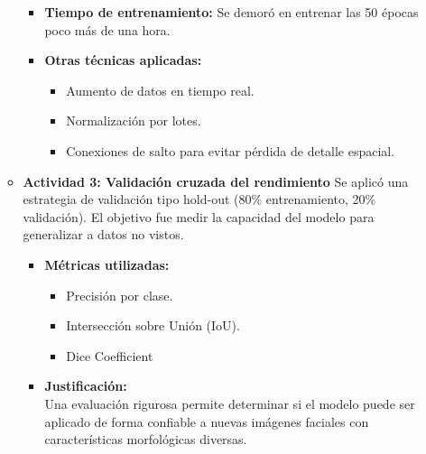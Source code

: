 \begin{enumerate}
\begin{itemize}
\begin{itemize}
  \item \textbf{Tiempo de entrenamiento:}
  Se demoró en entrenar las 50 épocas poco más de una hora.

  \item \textbf{Otras técnicas aplicadas:}
  \begin{itemize}
    \item Aumento de datos en tiempo real.
    \item Normalización por lotes.
    \item Conexiones de salto para evitar pérdida de detalle espacial.
  \end{itemize}
\end{itemize}

\vspace{0.5cm}


  \item\textbf{Actividad 3: Validación cruzada del rendimiento}
  Se aplicó una estrategia de validación tipo hold-out (80\% entrenamiento, 20\% validación). El objetivo fue medir la capacidad del modelo para generalizar a datos no vistos.

\begin{itemize}
  \item \textbf{Métricas utilizadas:}
  \begin{itemize}
    \item Precisión por clase.
    \item Intersección sobre Unión (IoU).
    \item Dice Coefficient
  \end{itemize}

  \item \textbf{Justificación:} \\
  Una evaluación rigurosa permite determinar si el modelo puede ser aplicado de forma confiable a nuevas imágenes faciales con características morfológicas diversas.
\end{itemize}



  \end{itemize}


\end{enumerate}
